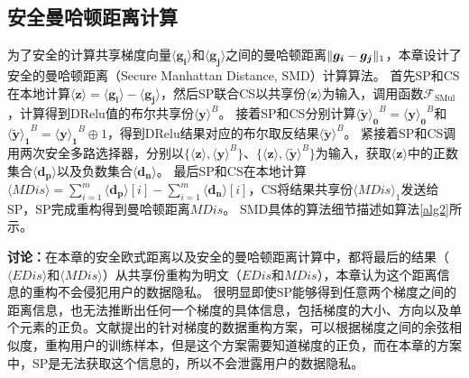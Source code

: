 \subsection{安全曼哈顿距离计算}\label{smd}
为了安全的计算共享梯度向量$\boldsymbol{\langle g_i\rangle}$和$\boldsymbol{\langle g_j\rangle}$之间的曼哈顿距离$\Vert \boldsymbol{g_i} - \boldsymbol{g_j}\Vert_1$，本章设计了安全的曼哈顿距离（Secure Manhattan Distance, SMD）计算算法。
首先SP和CS在本地计算$\boldsymbol{\langle z\rangle} = \boldsymbol{\langle g_i\rangle} - \boldsymbol{\langle g_j\rangle}$，然后SP联合CS以共享份$\boldsymbol{\langle z\rangle}$为输入，调用函数$\mathcal{F}_{\text {SMul}}$，计算得到DRelu值的布尔共享份$\boldsymbol{\langle y\rangle}^{B}$。
接着SP和CS分别计算$\boldsymbol{\langle \widetilde{y} \rangle_0}^{B} = \boldsymbol{\langle y\rangle_0}^{B}$和$\boldsymbol{\langle \widetilde{y} \rangle_1}^{B} = \boldsymbol{\langle y\rangle_1}^{B} \oplus 1$，得到DRelu结果对应的布尔取反结果$\boldsymbol{\langle \widetilde{y} \rangle}^{B}$。
紧接着SP和CS调用两次安全多路选择器，分别以$\{\boldsymbol{\langle z\rangle}, \boldsymbol{\langle y\rangle}^{B}\}$、$\{\boldsymbol{\langle z\rangle}, \boldsymbol{\langle \widetilde{y}\rangle}^{B}\}$为输入，获取$\boldsymbol{\langle z\rangle}$中的正数集合$\boldsymbol{
	\langle d_p\rangle}$以及负数集合$\boldsymbol{
	\langle d_n\rangle}$。
最后SP和CS在本地计算$\langle \textit{MDis}\rangle = \sum_{i=1}^{m}\boldsymbol{\langle d_p\rangle}[i] - \sum_{i=1}^{m}\boldsymbol{\langle d_n\rangle}[i]$，CS将结果共享份$\langle \textit{MDis}\rangle_1$发送给SP，SP完成重构得到曼哈顿距离$\textit{MDis}$。
SMD具体的算法细节描述如算法\ref{alg2}所示。

\textbf{讨论：}在本章的安全欧式距离以及安全的曼哈顿距离计算中，都将最后的结果（$\langle \textit{EDis}\rangle$和$\langle \textit{MDis}\rangle$）从共享份重构为明文（$\textit{EDis}$和$\textit{MDis}$），本章认为这个距离信息的重构不会侵犯用户的数据隐私。
很明显即使SP能够得到任意两个梯度之间的距离信息，也无法推断出任何一个梯度的具体信息，包括梯度的大小、方向以及单个元素的正负。文献\cite{geiping2020inverting}提出的针对梯度的数据重构方案，可以根据梯度之间的余弦相似度，重构用户的训练样本，但是这个方案需要知道梯度的正负，而在本章的方案中，SP是无法获取这个信息的，所以不会泄露用户的数据隐私。


